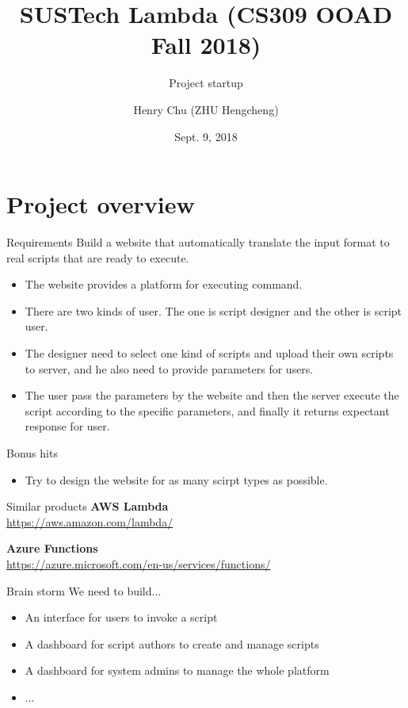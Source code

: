 \documentclass[aspectratio=169]{beamer}
\title{SUSTech Lambda (CS309 OOAD Fall 2018)}
\subtitle{Project startup}
\date{Sept. 9, 2018}
\author{Henry Chu (ZHU Hengcheng)}
\institute{Southern University of Science and Technology (SUSTech)}
\begin{document}
	\maketitle
	\section{Project overview}
	\begin{frame}{Requirements}
		Build a website that automatically translate the input 
		format to real scripts that are ready to execute.
		\begin{itemize}
			\small
			\item The website provides a platform for executing command.
			\item There are two kinds of user. The one is script designer and the other is script user.
			\item The designer need to select one kind of scripts and upload their own scripts to server, and he also need to provide parameters for users.
			\item The user pass the parameters by the website and then the server execute the script according to the specific parameters, and finally it returns expectant response for user.
		\end{itemize}
		Bonus hits
		\begin{itemize}
			\small
			\item Try to design the website for as many scirpt types as possible.
		\end{itemize}
	\end{frame}
	\begin{frame}{Similar products}
		\Large
		\textbf{AWS Lambda}\\  \hyperlink{https://aws.amazon.com/lambda/}{https://aws.amazon.com/lambda/}
	
		\bigskip
		
		\textbf{Azure Functions}\\ \hyperlink{https://azure.microsoft.com/en-us/services/functions/}{https://azure.microsoft.com/en-us/services/functions/}
	\end{frame}
	\begin{frame}{Brain storm}
		\Large We need to build...
		\begin{itemize}
			\normalsize
			\item An interface for users to invoke a script
			\item A dashboard for script authors to create and manage scripts
			\item A dashboard for system admins to manage the whole platform
			\item ...
		\end{itemize}
	\end{frame}
\end{document}
